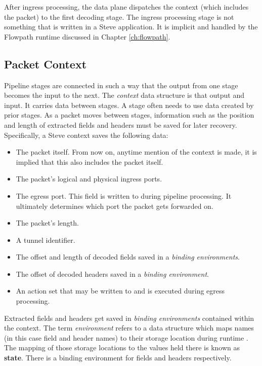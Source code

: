 After ingress processing, the data plane dispatches the context (which includes
the packet) to the first decoding stage. The ingress processing stage is not
something that is written in a Steve application. It is implicit and handled by
the Flowpath runtime discussed in Chapter \ref{ch:flowpath}.

\subsection{Packet Context} \label{context_desc}

Pipeline stages are connected in such a way that the output from one stage
becomes the input to the next. The \textit{context} data structure is that
output and input. It carries data between stages. A stage often needs to use
data created by prior stages. As a packet moves between stages, information such
as the position and length of extracted fields and headers must be saved for
later recovery. Specifically, a Steve context saves the following data:

\begin{itemize} \item The packet itself. From now on, anytime mention of the
context is made, it is implied that this also includes the packet itself. 

\item
The packet's logical and physical ingress ports. 

\item The egress port. This
field is written to during pipeline processing. It ultimately determines which
port the packet gets forwarded on. 

\item The packet's length. 

\item A tunnel identifier. 

\item The offset and length of decoded fields saved in a
\textit{binding environments}. 

\item The offset of decoded headers saved in a
\textit{binding environment}. 

\item An action set that may be written to and is
executed during egress processing. 
\end{itemize}

Extracted fields and headers get saved in \textit{binding environments}
contained within the context. The term \textit{environment} refers to a data
structure which maps names (in this case field and header names) to their
storage location during runtime \cite{compilers1}. The mapping of those storage
locations to the values held there is known as \textbf{state}. There is a
binding environment for fields and headers respectively.

